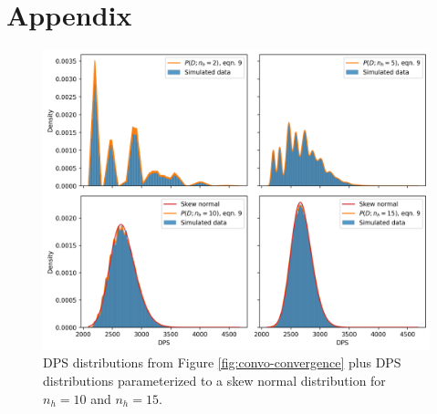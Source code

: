 \documentclass{article}
\begin{document}
    \newpage
    \section*{Appendix}
    \begin{figure}[H]
        \centering
        \includegraphics[width=0.95\linewidth]{img/skew-norm-fits.png}
        \caption{DPS distributions from Figure \ref{fig:convo-convergence} plus DPS distributions parameterized to a skew normal distribution for $n_h = 10$ and $n_h = 15$.}\label{fig:skew-norm-fits}
    \end{figure}
\end{document}
